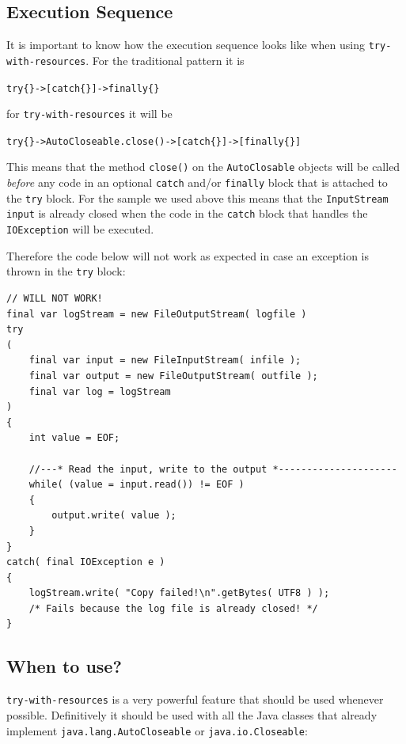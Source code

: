\documentclass[11pt,a4paper, titlepage, parskip=half, headsepline, footsepline, cleardoublepage=current, headheight=1cm]{scrbook}
\begin{document}
\subsection{Execution Sequence}\label{sec:ExecutionSequence}
It is important to know how the execution sequence looks like when using \lstinline|try-with-resources|. For the traditional pattern it is\\
\begin{center}
\verb#try{}->[catch{}]->finally{}#
\end{center} 
for \lstinline|try-with-resources| it will be\\ 
\begin{center}
\verb#try{}->AutoCloseable.close()->[catch{}]->[finally{}]#
\end{center}

This means that the method \lstinline|close()| on the \lstinline|AutoClosable| objects will be called \textit{before} any code in an optional \lstinline|catch| and/or \lstinline|finally| block that is attached to the \lstinline|try| block. For the sample we used above this means that the \lstinline|InputStream input| is already closed when the code in the \lstinline|catch| block that handles the \lstinline|IOException| will be executed.

Therefore the code below will not work as expected in case an exception is thrown in the \lstinline|try| block:
\begin{lstlisting}
// WILL NOT WORK!
final var logStream = new FileOutputStream( logfile )
try
(   
    final var input = new FileInputStream( infile );
    final var output = new FileOutputStream( outfile );
    final var log = logStream 
)
{
	int value = EOF;
	
    //---* Read the input, write to the output *---------------------
    while( (value = input.read()) != EOF )
    {
        output.write( value );
    }
}
catch( final IOException e )
{
    logStream.write( "Copy failed!\n".getBytes( UTF8 ) );
    /* Fails because the log file is already closed! */
}
\end{lstlisting}

\subsection{When to use?}
\lstinline|try-with-resources| is a very powerful feature that should be used whenever possible. Definitively it should be used with all the Java classes that already implement \lstinline|java.lang.AutoCloseable| or \lstinline|java.io.Closeable|:
\end{document}

